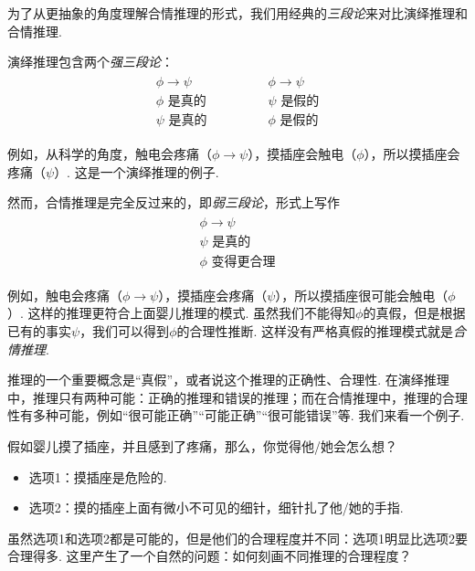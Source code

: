 为了从更抽象的角度理解合情推理的形式，我们用经典的\textit{三段论}来对比演绎推理和合情推理. 

演绎推理包含两个\textit{强三段论}：
    \[
        \begin{array}{c}
            \begin{array}{c}  
                \phi \to \psi \\ \phi\text{ 是真的} \\ \hline \psi\text{ 是真的}
            \end{array} 
            \qquad \qquad 
            \begin{array}{c}  
                \phi \to \psi \\ \psi\text{ 是假的} \\ \hline \phi\text{ 是假的}
            \end{array}
        \end{array} 
    \]

例如，从科学的角度，触电会疼痛（$\phi\to \psi$），摸插座会触电（$\phi$），所以摸插座会疼痛（$\psi$）. 这是一个演绎推理的例子.

然而，合情推理是完全反过来的，即\textit{弱三段论}，形式上写作 
        \[
        \begin{array}{c}
            \begin{array}{c}  
                \phi \to \psi \\ \psi\text{ 是真的} \\ \hline \phi\text{ 变得更合理}
            \end{array} 
        \end{array} 
    \]

例如，触电会疼痛（$\phi\to \psi$），摸插座会疼痛（$\psi$），所以摸插座很可能会触电（$\phi$）.  这样的推理更符合上面婴儿推理的模式. 虽然我们不能得知$\phi$的真假，但是根据已有的事实$\psi$，我们可以得到$\phi$的合理性推断. 这样没有严格真假的推理模式就是\textit{合情推理}.

推理的一个重要概念是“真假”，或者说这个推理的正确性、合理性. 在演绎推理中，推理只有两种可能：正确的推理和错误的推理；而在合情推理中，推理的合理性有多种可能，例如“很可能正确”“可能正确”“很可能错误”等. 我们来看一个例子. 

\begin{example}
    假如婴儿摸了插座，并且感到了疼痛，那么，你觉得他/她会怎么想？
    \begin{itemize}
        \item 选项1：摸插座是危险的. 
        \item 选项2：摸的插座上面有微小不可见的细针，细针扎了他/她的手指. 
    \end{itemize}
\end{example}
虽然选项1和选项2都是可能的，但是他们的合理程度并不同：选项1明显比选项2要合理得多. 这里产生了一个自然的问题：如何刻画不同推理的合理程度？

